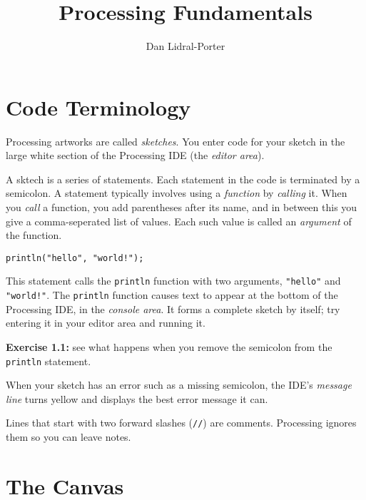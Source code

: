 \documentclass[
]{leaflet}
\title{Processing Fundamentals\vspace{-2ex}}
\author{%
  Dan Lidral-Porter\vspace{-2ex}
}
\date{}
\begin{document}


\maketitle
\thispagestyle{empty}


\section{Code Terminology}

Processing artworks are called \textit{sketches}.
You enter code for your sketch in the large white section of the Processing IDE (the \textit{editor area}).

A sktech is a series of statements.
Each statement in the code is terminated by a semicolon.
A statement typically involves using a \textit{function} by \textit{calling} it.
When you \textit{call} a function, you add parentheses after its name, and in between this you give a comma-seperated list of values.
Each such value is called an \textit{argument} of the function.

\begin{lstlisting}
println("hello", "world!");
\end{lstlisting}
\vspace{-0.5em}
This statement calls the \texttt{println} function with two arguments, \texttt{"hello"} and \texttt{"world!"}.
The \texttt{println} function causes text to appear at the bottom of the Processing IDE, in the \textit{console area}.
It forms a complete sketch by itself; try entering it in your editor area and running it.

\textbf{Exercise 1.1:} see what happens when you remove the semicolon from the \texttt{println} statement.

When your sketch has an error such as a missing semicolon, the IDE's \textit{message line} turns yellow and displays the best error message it can.

Lines that start with two forward slashes (\texttt{//}) are comments.
Processing ignores them so you can leave notes.

\vspace{-0.5em}

\section{The Canvas}
\end{document}

